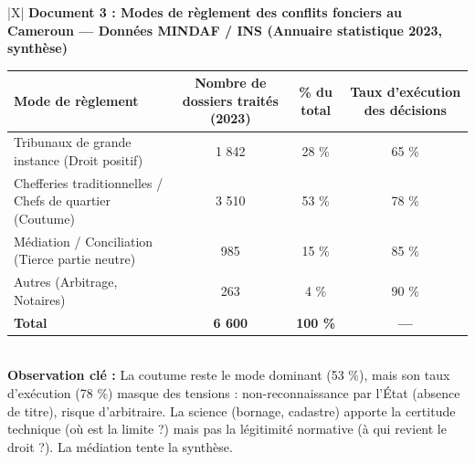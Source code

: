 \documentclass[11pt]{article}
\newcommand{\cle}[1]{{\popxbold\color{popdark}#1}}
\begin{document}
\vspace{0.5cm}
\begin{center}
\begin{tabularx}{\linewidth}{|X|}\hline
{}
\textbf{Document 3 : Modes de règlement des conflits fonciers au Cameroun — Données MINDAF / INS (Annuaire statistique 2023, synthèse)} \\
\begin{tabular}{|l|c|c|c|}\hline
\textbf{Mode de règlement} & \textbf{Nombre de dossiers traités (2023)} & \textbf{\% du total} & \textbf{Taux d'exécution des décisions} \\ \hline
Tribunaux de grande instance (Droit positif) & 1 842 & 28 \% & 65 \% \\ \hline
Chefferies traditionnelles / Chefs de quartier (Coutume) & 3 510 & 53 \% & 78 \% \\ \hline
Médiation / Conciliation (Tierce partie neutre) & 985 & 15 \% & 85 \% \\ \hline
Autres (Arbitrage, Notaires) & 263 & 4 \% & 90 \% \\ \hline
\textbf{Total} & \textbf{6 600} & \textbf{100 \%} & \textbf{—} \\ \hline
\end{tabular} \\
\textbf{Observation clé :} La coutume reste le mode dominant (53 \%), mais son taux d'exécution (78 \%) masque des tensions : non-reconnaissance par l'État (absence de titre), risque d'arbitraire. La science (bornage, cadastre) apporte la \cle{certitude technique} (où est la limite ?) mais pas la \cle{légitimité normative} (à qui revient le droit ?). La médiation tente la synthèse. \\ \hline
\end{tabularx}
\end{center}
\end{document}
